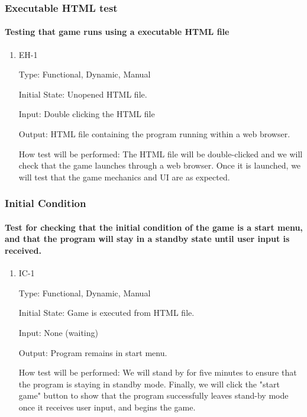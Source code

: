 \documentclass[12pt, titlepage]{article}
\begin{document}
\subsubsection{Executable HTML test}
\paragraph{Testing that game runs using a executable HTML file}

\begin{enumerate}

\item{EH-1\\}

Type: Functional, Dynamic, Manual
					
Initial State: Unopened HTML file.
					
Input: Double clicking the HTML file
					
Output: HTML file containing the program running within a web browser.
					
How test will be performed: The HTML file will be double-clicked and we will check that the game launches through a web browser. Once it is launched, we will test that the game mechanics and UI are as expected.

\end{enumerate}
\subsubsection{Initial Condition}
\paragraph{Test for checking that the initial condition of the game is a start menu, and that the program will stay in a standby state until user input is received.}

\begin{enumerate}

\item{IC-1\\}

Type: Functional, Dynamic, Manual
					
Initial State: Game is executed from HTML file.
					
Input: None (waiting)
					
Output: Program remains in start menu.
					
How test will be performed: We will stand by for five minutes to ensure that the program is staying in standby mode. Finally, we will click the "start game" button to show that the program successfully leaves stand-by mode once it receives user input, and begins the game.

\end{enumerate}
\end{document}

